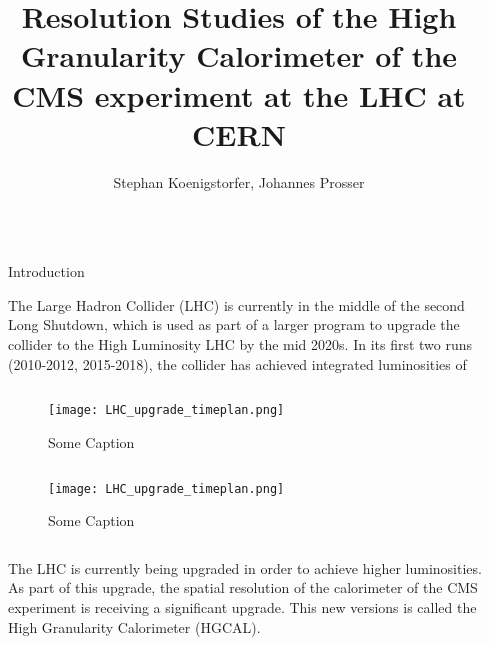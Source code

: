 \documentclass[final,hyperref={pdfpagelabels=false}]{beamer}
\title{\huge Resolution Studies of the High Granularity Calorimeter of the CMS experiment at the LHC at CERN} %
\author{Stephan Koenigstorfer, Johannes Prosser} %
\institute{Imperial College London, High Energy Physics Group} %
\begin{document}

\begin{frame}[t] %

\begin{columns}[t] %

\begin{column}{.02\textwidth}\end{column} %

\begin{column}{.465\textwidth} %


\begin{block}{Introduction}

		The Large Hadron Collider (LHC) is currently in the middle of the second Long Shutdown, which is used as part of a larger program to upgrade the collider to the High Luminosity LHC by the mid 2020s. In its first two runs (2010-2012, 2015-2018), the collider has achieved integrated luminosities of
		\begin{column}{0.4\textwidth}
		\begin{figure}
			\texttt{[image: LHC\_upgrade\_timeplan.png]}
			\caption{Some Caption}
		\end{figure}
		\end{column}
		\begin{column}{0.01\textwidth}\end{column}
		\begin{column}{0.4\textwidth}
			\begin{figure}
			\texttt{[image: LHC\_upgrade\_timeplan.png]}
			\caption{Some Caption}
			\end{figure}
		\end{column}






	The LHC is currently being upgraded in order to achieve higher luminosities. As part of this upgrade, the spatial resolution of the calorimeter of the CMS experiment is receiving a significant upgrade. This new versions is called the High Granularity Calorimeter (HGCAL). 


\end{block}
\end{column}
\end{columns}
\end{frame}
\end{document}
